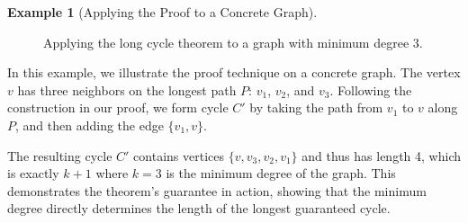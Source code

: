 \documentclass{article}
\theoremstyle{definition}
\newtheorem{example}{Example}
\begin{document}
\begin{example}[Applying the Proof to a Concrete Graph]
\begin{figure}[h]
\centering
{}
\caption{Applying the long cycle theorem to a graph with minimum degree 3.}
\label{fig:long-cycle-example}
\end{figure}

In this example, we illustrate the proof technique on a concrete graph. The vertex $v$ has three neighbors on the longest path $P$: $v_1$, $v_2$, and $v_3$. Following the construction in our proof, we form cycle $C'$ by taking the path from $v_1$ to $v$ along $P$, and then adding the edge $\{v_1, v\}$.

The resulting cycle $C'$ contains vertices $\{v, v_3, v_2, v_1\}$ and thus has length 4, which is exactly $k+1$ where $k=3$ is the minimum degree of the graph. This demonstrates the theorem's guarantee in action, showing that the minimum degree directly determines the length of the longest guaranteed cycle.
\end{example}
\end{document}
